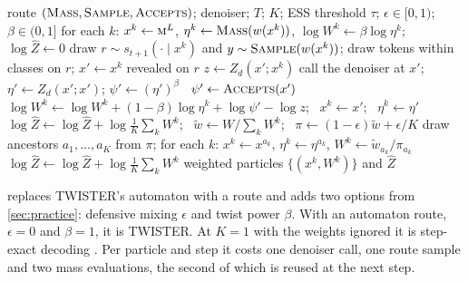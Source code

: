 \documentclass[11pt]{article}
\theoremstyle{definition}
\newcommand{\mask}{\textsc{m}}
\newcommand{\Zh}{\widehat Z}
\newcommand{\wt}{\tilde w}
\newcommand{\op}[1]{\textup{\textsc{#1}}}
\begin{document}
\begin{algorithm}[h]
\caption{Route-generic twisted SMC (one run with $K$ particles)}\label{alg:smc}
\begin{algorithmic}[1]
\Require route $(\op{Mass},\op{Sample},\op{Accepts})$; denoiser; $T$; $K$; ESS threshold $\tau$;
  $\epsilon\in[0,1)$; $\beta\in(0,1]$
\State for each $k$: $x^k\gets\mask^L$, $\eta^k\gets\op{Mass}(w(x^k))$, $\log W^k\gets\beta\log\eta^k$;
  $\log\Zh\gets0$
    \State draw $r\sim s_{t+1}(\cdot\mid x^k)$ and $y\sim\op{Sample}(w(x^k))$; draw tokens within classes on $r$;
      $x'\gets x^k$ revealed on $r$
    \State $z\gets Z_d(x';x^k)$ 
     call the denoiser at $x'$; $\eta'\gets Z_d(x';x')$; $\psi'\gets(\eta')^\beta$
    \Else\ $\psi'\gets\op{Accepts}(x')$ 
    \EndIf
    \State $\log W^k\gets\log W^k+(1-\beta)\log\eta^k+\log\psi'-\log z$; \ $x^k\gets x'$; \ $\eta^k\gets\eta'$
  \EndFor
    \State $\log\Zh\gets\log\Zh+\log\frac1K\sum_kW^k$; \ $\wt\gets W/\sum_kW^k$; \
      $\pi\gets(1-\epsilon)\wt+\epsilon/K$
    \State draw ancestors $a_1,\dots,a_K$ from $\pi$; for each $k$: $x^k\gets x^{a_k}$, $\eta^k\gets\eta^{a_k}$,
      $W^k\gets\wt_{a_k}/\pi_{a_k}$
  \EndIf
\EndFor
\State $\log\Zh\gets\log\Zh+\log\frac1K\sum_kW^k$
\State \Return weighted particles $\{(x^k,W^k)\}$ and $\Zh$
\end{algorithmic}
\end{algorithm}

 replaces TWISTER's automaton with a route and adds two options from \cref{sec:practice}: defensive
mixing $\epsilon$ and twist power $\beta$. With an automaton route, $\epsilon=0$ and $\beta=1$, it is TWISTER. At
$K=1$ with the weights ignored it is step-exact decoding \cite{de26}. Per particle and step it costs one denoiser
call, one route sample and two mass evaluations, the second of which is reused at the next step.
\end{document}

